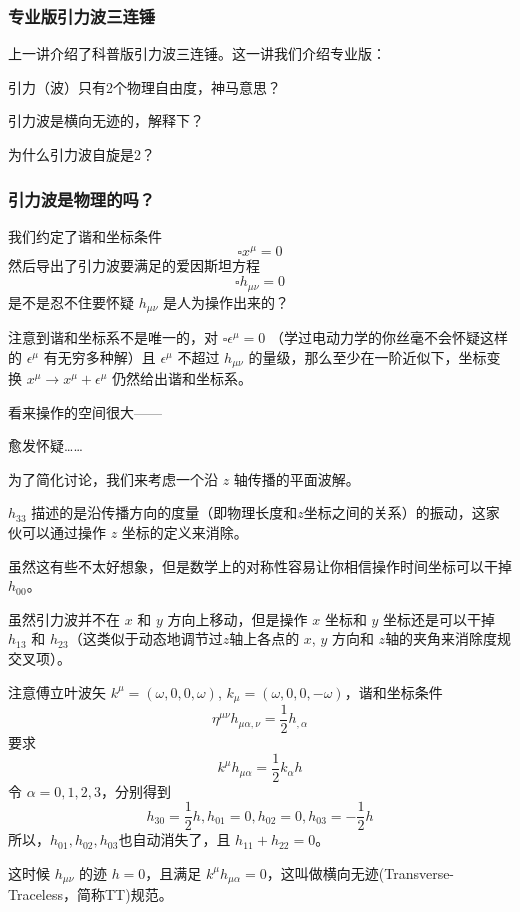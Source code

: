 \documentclass[CJK,13pt]{beamer}
\date{}
\begin{document}
  \bch

  \begin{frame}
    \frametitle{专业版引力波三连锤}
    上一讲介绍了科普版引力波三连锤。这一讲我们介绍专业版：
    \bitem
  \item{引力（波）只有2个物理自由度，神马意思？}
  \item{引力波是横向无迹的，解释下？}        
  \item{为什么引力波自旋是2？}
    \eitem

  \end{frame}
  
  
  \begin{frame}
    \frametitle{引力波是物理的吗？}
    我们约定了谐和坐标条件
    $$ \square x^\mu = 0$$
    然后导出了引力波要满足的爱因斯坦方程
    $$ \square h_{\mu\nu} = 0$$
    是不是忍不住要怀疑 $h_{\mu\nu}$ 是人为操作出来的？
  \end{frame}



  \begin{frame}
    注意到谐和坐标系不是唯一的，对 $\square \epsilon^\mu = 0$ （学过电动力学的你丝毫不会怀疑这样的 $\epsilon^\mu$ 有无穷多种解）且 $\epsilon^\mu$ 不超过 $h_{\mu\nu}$ 的量级，那么至少在一阶近似下，坐标变换 $x^\mu \rightarrow x^\mu+\epsilon^\mu$ 仍然给出谐和坐标系。

    \skipline
    
    看来操作的空间很大——

    \skipline
    
    愈发怀疑……
  \end{frame}

  \begin{frame}
    为了简化讨论，我们来考虑一个沿 $z$ 轴传播的平面波解。
    \bitem
  \item{$h_{33}$ 描述的是沿传播方向的度量（即物理长度和$z$坐标之间的关系）的振动，这家伙可以通过操作 $z$ 坐标的定义来消除。}
  \item{虽然这有些不太好想象，但是数学上的对称性容易让你相信操作时间坐标可以干掉 $h_{00}$。}
  \item{虽然引力波并不在 $x$ 和 $y$ 方向上移动，但是操作 $x$ 坐标和 $y$ 坐标还是可以干掉 $h_{13}$ 和 $h_{23}$（这类似于动态地调节过$z$轴上各点的 $x$, $y$ 方向和 $z$轴的夹角来消除度规交叉项）。}
    \eitem
  \end{frame}

  \begin{frame}
    注意傅立叶波矢  $k^\mu= (\omega, 0, 0, \omega)$, $k_\mu = (\omega, 0, 0, -\omega)$，谐和坐标条件
    $$\eta^{\mu\nu}h_{\mu\alpha,\nu} = \frac{1}{2}h_{,\alpha}$$
    要求
    $$ k^\mu h_{\mu\alpha} = \frac{1}{2}k_\alpha h$$
    令 $\alpha=0,1,2,3$，分别得到
    $$  h_{30} = \frac{1}{2}h, h_{01}=0, h_{02}=0, h_{03}=-\frac{1}{2}h $$
    所以，$h_{01},h_{02},h_{03}$也自动消失了，且 $h_{11}+h_{22}=0$。

    \skipline
    
     这时候 $h_{\mu\nu}$ 的迹 $h=0$，且满足 $k^\mu h_{\mu\alpha} = 0$，这叫做{\blue 横向无迹(Transverse-Traceless，简称TT)规范}。
  \end{frame}
\end{document}
